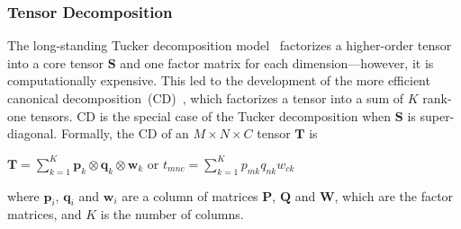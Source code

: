 \subsubsection{Tensor Decomposition}
The long-standing Tucker decomposition model~\cite{tucker1963implications} factorizes a 
higher-order tensor into a core tensor $\mathbf{S}$ and one factor matrix for each 
dimension---however, it is computationally expensive.
This led to the development of the more efficient canonical decomposition~(CD)~\cite{carroll1970analysis}, which factorizes a tensor into a sum of $K$ rank-one tensors.
CD is the special case of the Tucker decomposition when $\mathbf{S}$ is super-diagonal.
Formally, the CD of an $M \times N \times C$ tensor $\mathbf{T}$ is
\begin{center}
$\mathbf{T}=\sum\limits_{k=1}^{K}\mathbf{p}_k\otimes \mathbf{q}_k\otimes \mathbf{w}_k$
or
$t_{mnc}=\sum\limits_{k=1}^{K}p_{mk} q_{nk} w_{ck}$
\end{center}
where $\mathbf{p}_i$, $\mathbf{q}_i$ and $\mathbf{w}_i$ are a column of matrices $\mathbf{P}$, $\mathbf{Q}$ and $\mathbf{W}$, which are the factor matrices, and $K$ is the number of columns. 


